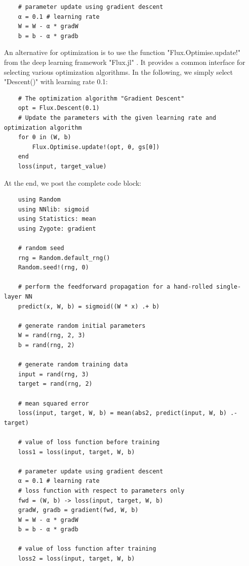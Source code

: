 \documentclass[
	parskip, 			   %
	twoside, 			   %
	DIV=14, 			   %
	BCOR=15.0mm, 		   %
	headsepline, 		   %
	open=right, 		   %
	captions=tableheading, %
	bibliography=totoc,    %
	numbers=noenddot       %
]{scrreprt}
\begin{document}
\begin{verbatim}
    # parameter update using gradient descent
    α = 0.1 # learning rate
    W = W - α * gradW
    b = b - α * gradb
\end{verbatim}

An alternative for optimization is to use the function "Flux.Optimise.update!" from the deep learning framework "Flux.jl" \cite{Flux.jl-2018} \cite{innes:2018}. It provides a common interface for selecting various optimization algorithms. In the following, we simply select "Descent()" with learning rate 0.1:

\begin{verbatim}
    # The optimization algorithm "Gradient Descent"
    opt = Flux.Descent(0.1)
    # Update the parameters with the given learning rate and optimization algorithm
    for θ in (W, b)
        Flux.Optimise.update!(opt, θ, gs[θ])
    end
    loss(input, target_value)
\end{verbatim}

At the end, we post the complete code block:

\begin{verbatim}
    using Random
    using NNlib: sigmoid
    using Statistics: mean
    using Zygote: gradient
    
    # random seed
    rng = Random.default_rng()
    Random.seed!(rng, 0)
    
    # perform the feedforward propagation for a hand-rolled single-layer NN
    predict(x, W, b) = sigmoid((W * x) .+ b)
    
    # generate random initial parameters
    W = rand(rng, 2, 3)
    b = rand(rng, 2)
    
    # generate random training data
    input = rand(rng, 3)
    target = rand(rng, 2)
    
    # mean squared error
    loss(input, target, W, b) = mean(abs2, predict(input, W, b) .- target)
    
    # value of loss function before training
    loss1 = loss(input, target, W, b)
    
    # parameter update using gradient descent
    α = 0.1 # learning rate
    # loss function with respect to parameters only
    fwd = (W, b) -> loss(input, target, W, b)
    gradW, gradb = gradient(fwd, W, b)
    W = W - α * gradW
    b = b - α * gradb

    # value of loss function after training
    loss2 = loss(input, target, W, b)
\end{verbatim}
\end{document}
